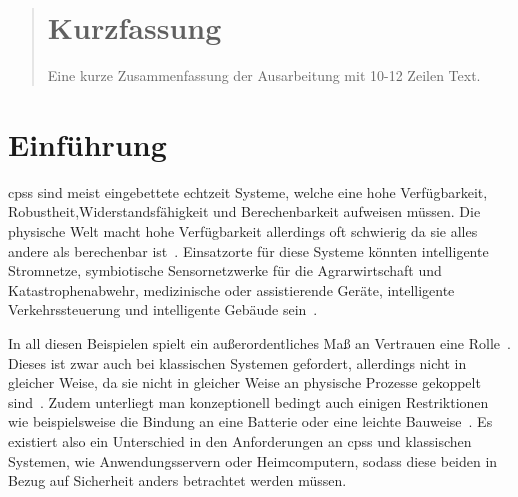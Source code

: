 \documentclass[final,bibliography=totocnumbered]{include/sikseminar}
\begin{document}
\makeTitle

\makeAuthor
\date{Datum des Vortrags \todo}
\subject{Seminar Cyber-Physical Systems}

\maketitle

\begin{abstract}
\section*{Kurzfassung}
Eine kurze Zusammenfassung der Ausarbeitung mit 10-12 Zeilen Text.
\end{abstract}
\thispagestyle{empty}
\newpage
\tableofcontents
\newpage

\section{Einführung}\label{sec:intro}
\glspl{cps} sind meist eingebettete echtzeit Systeme, welche eine hohe Verfügbarkeit, Robustheit,Widerstandsfähigkeit und Berechenbarkeit aufweisen müssen.
Die physische Welt macht hohe Verfügbarkeit allerdings oft schwierig da sie alles andere als berechenbar ist~\cite{Lee08,SGL+08}.
Einsatzorte für diese Systeme könnten intelligente Stromnetze, symbiotische Sensornetzwerke für die Agrarwirtschaft und Katastrophenabwehr, medizinische oder assistierende Geräte, intelligente Verkehrssteuerung und intelligente Gebäude sein~\cite{RLS+10}.

In all diesen Beispielen spielt ein außerordentliches Maß an Vertrauen eine Rolle~\cite{SGL+08}.
Dieses ist zwar auch bei klassischen Systemen gefordert, allerdings nicht in gleicher Weise, da sie nicht in gleicher Weise an physische Prozesse gekoppelt sind~\cite{BG11}.
Zudem unterliegt man konzeptionell bedingt auch einigen Restriktionen wie beispielsweise die Bindung an eine Batterie oder eine leichte Bauweise~\cite{YWY+17}.
Es existiert also ein Unterschied in den Anforderungen an \glspl{cps} und klassischen Systemen, wie Anwendungsservern oder Heimcomputern, sodass diese beiden in Bezug auf Sicherheit anders betrachtet werden müssen.
\end{document}
